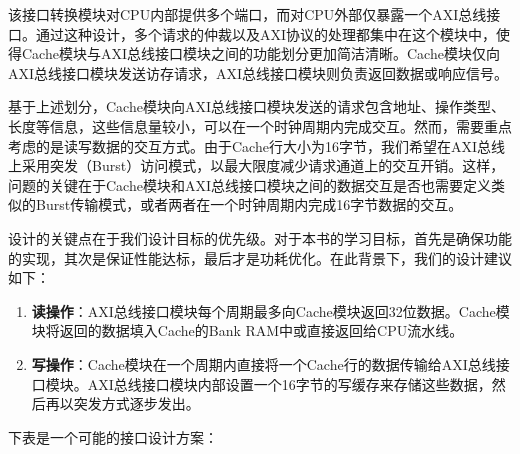 该接口转换模块对CPU内部提供多个端口，而对CPU外部仅暴露一个AXI总线接口。通过这种设计，多个请求的仲裁以及AXI协议的处理都集中在这个模块中，使得Cache模块与AXI总线接口模块之间的功能划分更加简洁清晰。Cache模块仅向AXI总线接口模块发送访存请求，AXI总线接口模块则负责返回数据或响应信号。

基于上述划分，Cache模块向AXI总线接口模块发送的请求包含地址、操作类型、长度等信息，这些信息量较小，可以在一个时钟周期内完成交互。然而，需要重点考虑的是读写数据的交互方式。由于Cache行大小为16字节，我们希望在AXI总线上采用突发（Burst）访问模式，以最大限度减少请求通道上的交互开销。这样，问题的关键在于Cache模块和AXI总线接口模块之间的数据交互是否也需要定义类似的Burst传输模式，或者两者在一个时钟周期内完成16字节数据的交互。

设计的关键点在于我们设计目标的优先级。对于本书的学习目标，首先是确保功能的实现，其次是保证性能达标，最后才是功耗优化。在此背景下，我们的设计建议如下：

\begin{enumerate}
\def\labelenumi{\arabic{enumi}.}
\tightlist
\item
  \textbf{读操作}：AXI总线接口模块每个周期最多向Cache模块返回32位数据。Cache模块将返回的数据填入Cache的Bank RAM中或直接返回给CPU流水线。
\item
  \textbf{写操作}：Cache模块在一个周期内直接将一个Cache行的数据传输给AXI总线接口模块。AXI总线接口模块内部设置一个16字节的写缓存来存储这些数据，然后再以突发方式逐步发出。
\end{enumerate}

下表是一个可能的接口设计方案：

